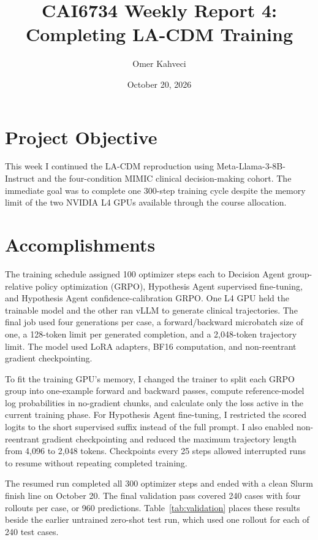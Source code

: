 \documentclass[11pt]{article}
\title{CAI6734 Weekly Report 4: Completing LA-CDM Training}
\author{Omer Kahveci}
\date{October 20, 2026}
\begin{document}
\maketitle

\section{Project Objective}

This week I continued the LA-CDM reproduction using Meta-Llama-3-8B-Instruct
and the four-condition MIMIC clinical decision-making cohort. The immediate
goal was to complete one 300-step training cycle despite the memory limit of
the two NVIDIA L4 GPUs available through the course allocation.

\section{Accomplishments}

The training schedule assigned 100 optimizer steps each to Decision Agent
group-relative policy optimization (GRPO), Hypothesis Agent supervised
fine-tuning, and Hypothesis Agent confidence-calibration GRPO. One L4 GPU
held the trainable model and the other ran vLLM to generate clinical
trajectories. The final job used four generations per case, a forward/backward
microbatch size of one, a 128-token limit per generated completion, and a
2,048-token trajectory limit. The model used LoRA adapters, BF16 computation,
and non-reentrant gradient checkpointing.

To fit the training GPU's memory, I changed the trainer to split each GRPO
group into one-example forward and backward passes, compute reference-model
log probabilities in no-gradient chunks, and calculate only the loss active
in the current training phase. For Hypothesis Agent fine-tuning, I restricted
the scored logits to the short supervised suffix instead of the full prompt.
I also enabled non-reentrant gradient checkpointing and reduced the maximum
trajectory length from 4,096 to 2,048 tokens. Checkpoints every 25 steps
allowed interrupted runs to resume without repeating completed training.

The resumed run completed all 300 optimizer steps and ended with a clean
Slurm finish line on October 20. The final validation pass covered 240 cases
with four rollouts per case, or 960 predictions. Table~\ref{tab:validation}
places these results beside the earlier untrained zero-shot test run, which
used one rollout for each of 240 test cases.
\end{document}
